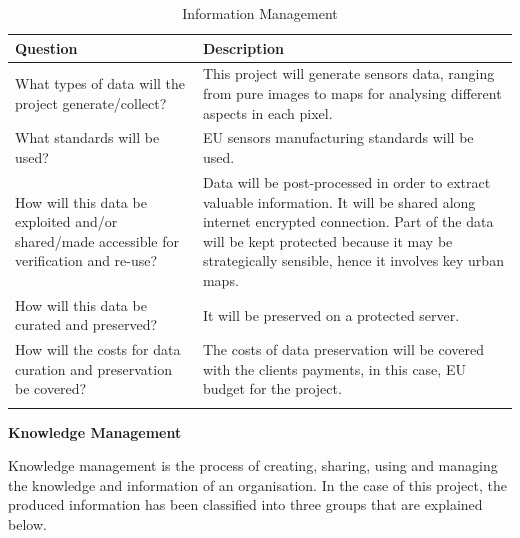 \begin{longtable}[H]{p{7cm} p{7cm}}
		
		\toprule[2pt]
		
		\textbf{Question} &  \textbf{Description}\\
		
		\midrule [1.5pt]
		\endhead
		
		What types of data will the project generate/collect?  & This project will generate sensors data, ranging from pure images to maps for analysing different aspects in each pixel.\vspace{0.2cm}\\
		
		\midrule
		
		What standards will be used?  & EU sensors manufacturing standards will be used.\vspace{0.2cm}\\
		
		\midrule
		
		How will this data be exploited and/or shared/made accessible for verification and re-use? & Data will be post-processed in order to extract valuable information. It will be shared along internet encrypted connection. Part of the data will be kept protected because it may be strategically sensible, hence it involves key urban maps.\vspace{0.2cm}\\
		
		\midrule
		
		How will this data be curated and preserved? & It will be preserved on a protected server.\vspace{0.2cm}\\
		
		\midrule
		
		How will the costs for data curation and preservation be covered? & The costs of data preservation will be covered with the clients payments, in this case, EU budget for the project.\vspace{0.2cm}\\	
		
		\bottomrule[2pt]
		
	\caption{Information Management}
\end{longtable}

\textbf{Knowledge Management}

Knowledge management is the process of creating, sharing, using and managing the knowledge and information of an organisation. In the case of this project, the produced information has been classified into three groups that are explained below.

